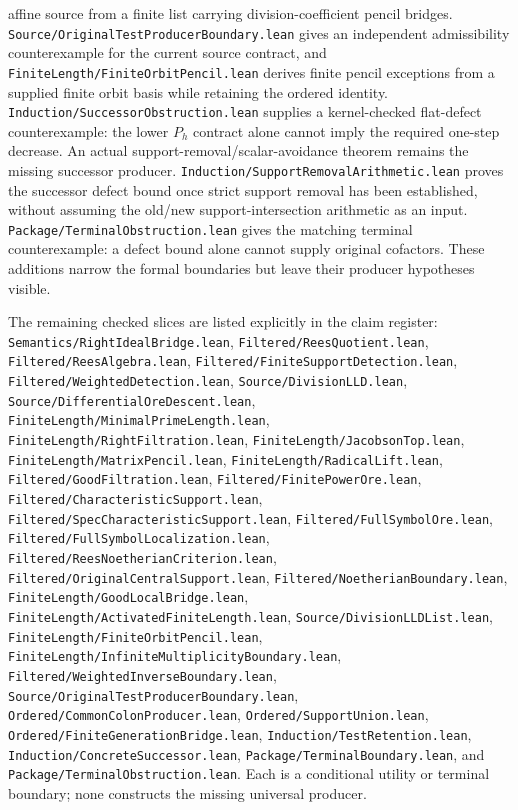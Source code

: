 \documentclass[10pt,a4paper]{article}
\newcommand{\lean}[1]{\nolinkurl{#1}}
\begin{document}
affine source from a finite list carrying division-coefficient pencil bridges.
\lean{Source/OriginalTestProducerBoundary.lean} gives an independent
admissibility counterexample for the current source contract, and
\lean{FiniteLength/FiniteOrbitPencil.lean} derives finite pencil exceptions
from a supplied finite orbit basis while retaining the ordered identity.
\lean{Induction/SuccessorObstruction.lean} supplies a kernel-checked
flat-defect counterexample: the lower \(P_h\) contract alone cannot imply the
required one-step decrease. An actual support-removal/scalar-avoidance theorem
remains the missing successor producer.
\lean{Induction/SupportRemovalArithmetic.lean} proves the successor defect
bound once strict support removal has been established, without assuming the
old/new support-intersection arithmetic as an input.
\lean{Package/TerminalObstruction.lean} gives the matching terminal
counterexample: a defect bound alone cannot supply original cofactors.
These additions narrow the formal boundaries but leave their producer
hypotheses visible.

The remaining checked slices are listed explicitly in the claim register:
\lean{Semantics/RightIdealBridge.lean}, \lean{Filtered/ReesQuotient.lean},
\lean{Filtered/ReesAlgebra.lean}, \lean{Filtered/FiniteSupportDetection.lean},
\lean{Filtered/WeightedDetection.lean}, \lean{Source/DivisionLLD.lean},
\lean{Source/DifferentialOreDescent.lean},
\lean{FiniteLength/MinimalPrimeLength.lean},
\lean{FiniteLength/RightFiltration.lean}, \lean{FiniteLength/JacobsonTop.lean},
\lean{FiniteLength/MatrixPencil.lean}, \lean{FiniteLength/RadicalLift.lean},
\lean{Filtered/GoodFiltration.lean}, \lean{Filtered/FinitePowerOre.lean},
\lean{Filtered/CharacteristicSupport.lean},
\lean{Filtered/SpecCharacteristicSupport.lean}, \lean{Filtered/FullSymbolOre.lean},
\lean{Filtered/FullSymbolLocalization.lean},
\lean{Filtered/ReesNoetherianCriterion.lean},
\lean{Filtered/OriginalCentralSupport.lean},
\lean{Filtered/NoetherianBoundary.lean}, \lean{FiniteLength/GoodLocalBridge.lean},
\lean{FiniteLength/ActivatedFiniteLength.lean}, \lean{Source/DivisionLLDList.lean},
\lean{FiniteLength/FiniteOrbitPencil.lean},
\lean{FiniteLength/InfiniteMultiplicityBoundary.lean},
\lean{Filtered/WeightedInverseBoundary.lean},
\lean{Source/OriginalTestProducerBoundary.lean},
\lean{Ordered/CommonColonProducer.lean},
\lean{Ordered/SupportUnion.lean},
\lean{Ordered/FiniteGenerationBridge.lean},
\lean{Induction/TestRetention.lean},
\lean{Induction/ConcreteSuccessor.lean}, \lean{Package/TerminalBoundary.lean},
and \lean{Package/TerminalObstruction.lean}. Each is a conditional utility or
terminal boundary; none constructs the missing universal producer.
\end{document}
